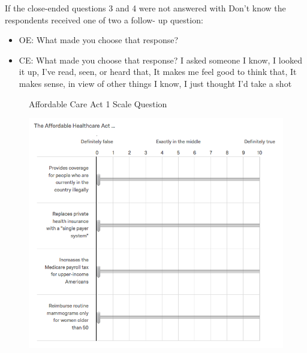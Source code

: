 If the close-ended questions 3 and 4 were not answered with Don’t know the respondents received one of two a follow- up question:
\begin{itemize}
\item OE: What made you choose that response?
 \item CE: What made you choose that response? I asked someone I know, I looked it up, I’ve read, seen, or heard that, It makes me feel good to think that, It makes sense, in view of other things I know, I just thought I’d take a shot
\end{itemize}

\begin{center}
	\begin{figure}[H]
		\centering
		\caption{Affordable Care Act 1 Scale Question}
		\includegraphics[width=\textwidth]{../figs/hk_aca1.png}
		\label{fig:aca1}
		\caption*{\footnotesize }
	\end{figure}
\end{center}


